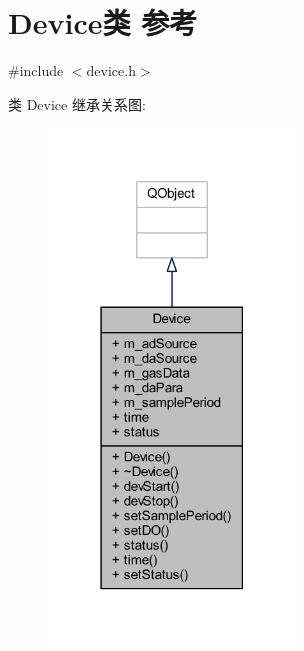 \hypertarget{class_device}{}\section{Device类 参考}
\label{class_device}


{\ttfamily \#include $<$device.\+h$>$}



类 Device 继承关系图\+:
\nopagebreak
\begin{figure}[H]
\begin{center}
\leavevmode
\includegraphics[width=186pt]{class_device__inherit__graph}
\end{center}
\end{figure}



